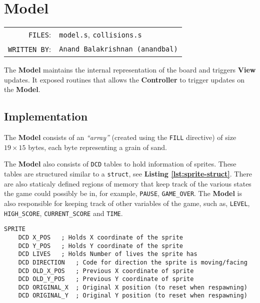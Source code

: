   \section{Model}

  \begin{table}[H]
  \begin{tabular}{rl}
    \texttt{FILES}:         &\texttt{model.s}, \texttt{collisions.s} \\
    \texttt{WRITTEN BY}:    &\texttt{Anand Balakrishnan (anandbal)}
  \end{tabular}
  \end{table}

  The \textbf{Model} maintains the internal representation of the board and triggers \textbf{View} updates. It exposed routines that allows the
  \textbf{Controller} to trigger updates on the \textbf{Model}.

    \subsection{Implementation}

    The \textbf{Model} consists of an \emph{``array''} (created using the \texttt{FILL} directive)
    of size $19 \times 15$ bytes, each byte representing a grain of sand.

    The \textbf{Model} also consists of \texttt{DCD} tables to hold information of sprites. These tables are structured similar to a \texttt{struct}, see \textbf{Listing \ref{lst:sprite-struct}}.
    There are also staticaly defined regions of memory that keep track of the various states the game could possibly be in,
    for example, \texttt{PAUSE}, \texttt{GAME\_OVER}.
    The \textbf{Model} is also responsible for keeping track of other variables of the game,
    such as, \texttt{LEVEL}, \texttt{HIGH\_SCORE}, \texttt{CURRENT\_SCORE} and \texttt{TIME}.


    \begin{lstlisting}[float,floatplacement=H,caption={Structure for \texttt{SPRITE} data},label={lst:sprite-struct}]
SPRITE
	DCD X_POS	; Holds X coordinate of the sprite
	DCD Y_POS	; Holds Y coordinate of the sprite
	DCD LIVES	; Holds Number of lives the sprite has
	DCD DIRECTION	; Code for direction the sprite is moving/facing
	DCD OLD_X_POS	; Previous X coordinate of sprite
	DCD OLD_Y_POS	; Previous Y coordinate of sprite
	DCD ORIGINAL_X	; Original X position (to reset when respawning)
	DCD ORIGINAL_Y	; Original Y position (to reset when respawning)

    \end{lstlisting}

